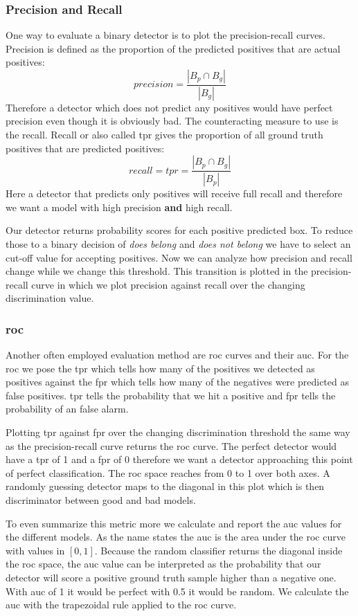 \subsubsection{Precision and Recall}
One way to evaluate a binary detector is to plot the precision-recall curves. Precision is defined as the proportion of the predicted positives that are actual positives:
\begin{equation}
    \textit{precision} = \frac{|B_p \cap B_g|}{|B_g|}
\end{equation}
Therefore a detector which does not predict any positives would have perfect precision even though it is obviously bad. The counteracting measure to use is the recall. Recall or also called \gls{tpr} gives the proportion of all ground truth positives that are predicted positives:
\begin{equation}
    \textit{recall} = \textit{tpr} = \frac{|B_p \cap B_g|}{|B_p|}
\end{equation}
Here a detector that predicts only positives will receive full recall and therefore we want a model with high precision \textbf{and} high recall.

Our detector returns probability scores for each positive predicted box. To reduce those to a binary decision of \textit{does belong} and \textit{does not belong} we have to select an cut-off value for accepting positives. Now we can analyze how precision and recall change while we change this threshold. This transition is plotted in the precision-recall curve in which we plot precision against recall over the changing discrimination value.

\subsubsection{\gls{roc}}
Another often employed evaluation method are \gls{roc} curves and their \gls{auc}. For the \gls{roc} we pose the \gls{tpr} which tells how many of the positives we detected as positives against the \gls{fpr} which tells how many of the negatives were predicted as false positives. \gls{tpr} tells the probability that we hit a positive and \gls{fpr} tells the probability of an false alarm.

Plotting \gls{tpr} against \gls{fpr} over the changing discrimination threshold the same way as the precision-recall curve returns the \gls{roc} curve. The perfect detector would have a \gls{tpr} of 1 and a \gls{fpr} of 0 therefore we want a detector approaching this point of perfect classification. The \gls{roc} space reaches from 0 to 1 over both axes. A randomly guessing detector maps to the diagonal in this plot which is then discriminator between good and bad models.

To even summarize this metric more we calculate and report the \gls{auc} values for the different models. As the name states the \gls{auc} is the area under the \gls{roc} curve with values in $[0, 1]$. Because the random classifier returns the diagonal inside the \gls{roc} space, the \gls{auc} value can be interpreted as the probability that our detector will score a positive ground truth sample higher than a negative one. With \gls{auc} of 1 it would be perfect with 0.5 it would be random. We calculate the \gls{auc} with the trapezoidal rule applied to the \gls{roc} curve.

